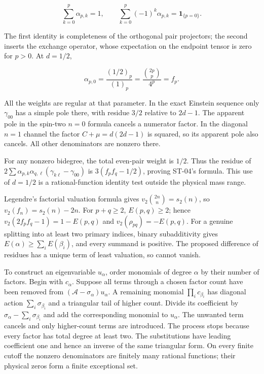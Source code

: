 \documentclass[a4paper,11pt]{article}
\numberwithin{equation}{section}
\begin{document}
\[
\sum_{k=0}^p\alpha_{p,k}=1,\qquad
\sum_{k=0}^p(-1)^k\alpha_{p,k}=\mathbf1_{\{p=0\}}.
\]

The first identity is completeness of the orthogonal pair projectors; the second inserts the exchange operator, whose expectation on the endpoint tensor is zero for \(p>0\). At \(d=1/2\),

\[
\alpha_{p,0}=\frac{(1/2)_p}{(1)_p}
=\frac{\binom{2p}{p}}{4^p}=f_p.
\]

All the weights are regular at that parameter. In the exact Einstein sequence only \(\gamma_{00}\) has a simple pole there, with residue \(3/2\) relative to \(2d-1\). The apparent pole in the spin-two \(n=0\) formula cancels a numerator factor. In the diagonal \(n=1\) channel the factor \(C+\mu=d(2d-1)\) is squared, so its apparent pole also cancels. All other denominators are nonzero there.

For any nonzero bidegree, the total even-pair weight is \(1/2\). Thus the residue of \(2\sum\alpha_{p,k}\alpha_{q,\ell}(\gamma_{k\ell}-\gamma_{00})\) is \(3(f_pf_q-1/2)\), proving ST-04's formula. This use of \(d=1/2\) is a rational-function identity test outside the physical mass range.

Legendre's factorial valuation formula gives \(v_2\binom{2n}{n}=s_2(n)\), so \(v_2(f_n)=s_2(n)-2n\). For \(p+q\geq2\), \(E(p,q)\geq2\); hence \(v_2(2f_pf_q-1)=1-E(p,q)\) and \(v_2(\rho_{pq})=-E(p,q)\). For a genuine splitting into at least two primary indices, binary subadditivity gives \(E(\alpha)\geq\sum_iE(\beta_i)\), and every summand is positive. The proposed difference of residues has a unique term of least valuation, so cannot vanish.

To construct an eigenvariable \(u_\alpha\), order monomials of degree \(\alpha\) by their number of factors. Begin with \(c_\alpha\). Suppose all terms through a chosen factor count have been removed from \((\mathscr A-\sigma_\alpha)u_\alpha\). A remaining monomial \(\prod_i c_{\beta_i}\) has diagonal action \(\sum_i\sigma_{\beta_i}\) and a triangular tail of higher count. Divide its coefficient by \(\sigma_\alpha-\sum_i\sigma_{\beta_i}\) and add the corresponding monomial to \(u_\alpha\). The unwanted term cancels and only higher-count terms are introduced. The process stops because every factor has total degree at least two. The substitutions have leading coefficient one and hence an inverse of the same triangular form. On every finite cutoff the nonzero denominators are finitely many rational functions; their physical zeros form a finite exceptional set.
\end{document}
